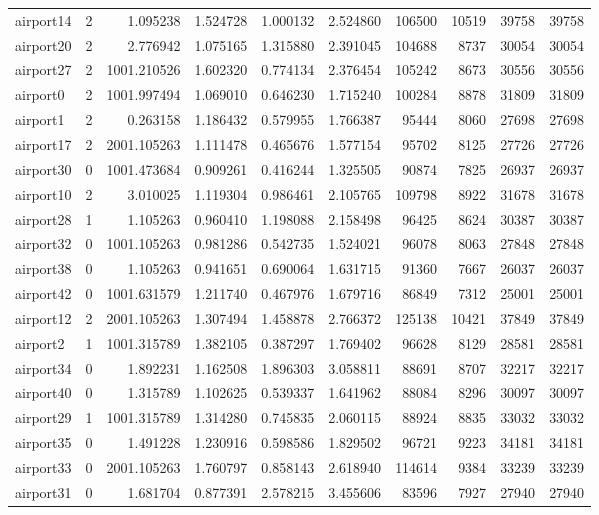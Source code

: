 \begin{longtable}{|l|r|r|r|r|r|r|r|r|r|}
airport14 & 2 & 1.095238 & 1.524728 & 1.000132 & 2.524860 & 106500 & 10519 & 39758 & 39758 \\
airport20 & 2 & 2.776942 & 1.075165 & 1.315880 & 2.391045 & 104688 & 8737 & 30054 & 30054 \\
airport27 & 2 & 1001.210526 & 1.602320 & 0.774134 & 2.376454 & 105242 & 8673 & 30556 & 30556 \\
airport0 & 2 & 1001.997494 & 1.069010 & 0.646230 & 1.715240 & 100284 & 8878 & 31809 & 31809 \\
airport1 & 2 & 0.263158 & 1.186432 & 0.579955 & 1.766387 & 95444 & 8060 & 27698 & 27698 \\
airport17 & 2 & 2001.105263 & 1.111478 & 0.465676 & 1.577154 & 95702 & 8125 & 27726 & 27726 \\
airport30 & 0 & 1001.473684 & 0.909261 & 0.416244 & 1.325505 & 90874 & 7825 & 26937 & 26937 \\
airport10 & 2 & 3.010025 & 1.119304 & 0.986461 & 2.105765 & 109798 & 8922 & 31678 & 31678 \\
airport28 & 1 & 1.105263 & 0.960410 & 1.198088 & 2.158498 & 96425 & 8624 & 30387 & 30387 \\
airport32 & 0 & 1001.105263 & 0.981286 & 0.542735 & 1.524021 & 96078 & 8063 & 27848 & 27848 \\
airport38 & 0 & 1.105263 & 0.941651 & 0.690064 & 1.631715 & 91360 & 7667 & 26037 & 26037 \\
airport42 & 0 & 1001.631579 & 1.211740 & 0.467976 & 1.679716 & 86849 & 7312 & 25001 & 25001 \\
airport12 & 2 & 2001.105263 & 1.307494 & 1.458878 & 2.766372 & 125138 & 10421 & 37849 & 37849 \\
airport2 & 1 & 1001.315789 & 1.382105 & 0.387297 & 1.769402 & 96628 & 8129 & 28581 & 28581 \\
airport34 & 0 & 1.892231 & 1.162508 & 1.896303 & 3.058811 & 88691 & 8707 & 32217 & 32217 \\
airport40 & 0 & 1.315789 & 1.102625 & 0.539337 & 1.641962 & 88084 & 8296 & 30097 & 30097 \\
airport29 & 1 & 1001.315789 & 1.314280 & 0.745835 & 2.060115 & 88924 & 8835 & 33032 & 33032 \\
airport35 & 0 & 1.491228 & 1.230916 & 0.598586 & 1.829502 & 96721 & 9223 & 34181 & 34181 \\
airport33 & 0 & 2001.105263 & 1.760797 & 0.858143 & 2.618940 & 114614 & 9384 & 33239 & 33239 \\
airport31 & 0 & 1.681704 & 0.877391 & 2.578215 & 3.455606 & 83596 & 7927 & 27940 & 27940 \\

\end{longtable}

